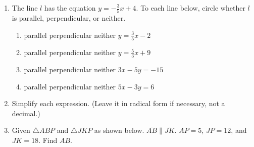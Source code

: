 \documentclass[12pt, twoside]{article}
\begin{document}
\begin{enumerate}
\newpage




  \item The line $l$ has the equation $y=-\frac{3}{5}x+4$. To each line below, circle whether $l$ is parallel, perpendicular, or neither.
    \begin{enumerate}
      \item parallel \quad perpendicular \quad neither \qquad $y=\frac{3}{5}x-2$
      \vspace{0.5cm}
      \item parallel \quad perpendicular \quad neither \qquad $y=\frac{5}{3}x+9$
      \vspace{0.5cm}
      \item parallel \quad perpendicular \quad neither \qquad $3x-5y=-15$
      \vspace{2cm}
      \item parallel \quad perpendicular \quad neither \qquad $5x-3y=6$
      \vspace{1.7cm}
    \end{enumerate}

  \item Simplify each expression. (Leave it in radical form if necessary, not a decimal.)
    \begin{enumerate}
    \end{enumerate}

\newpage

 \item Given $\triangle ABP$ and $\triangle JKP$ as shown below. $\overline{AB} \parallel \overline{JK}$. $AP=5$, $JP=12$, and $JK=18$. Find $AB$.
 \begin{center}
     \end{center}
 \vspace{2cm}




\end{enumerate}
\end{document}
